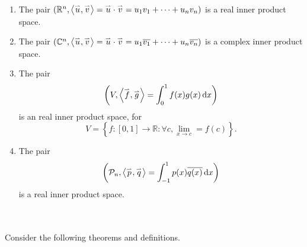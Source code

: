         \begin{enumerate}
            \item The pair \((\mathbb{R}^n, \left\langle \overset{_{\rightharpoonup}}{u},\overset{_{\rightharpoonup}}{v}\right\rangle=\overset{_{\rightharpoonup}}{u}\cdot\overset{_{\rightharpoonup}}{v}=u_1v_1+\cdots+u_nv_n)\) is a real inner product space.
            \item The pair \((\mathbb{C}^n, \left\langle \overset{_{\rightharpoonup}}{u},\overset{_{\rightharpoonup}}{v}\right\rangle=\overset{_{\rightharpoonup}}{u}\cdot\overset{_{\rightharpoonup}}{v}=u_1\overline{v_1}+\cdots+u_n\overline{v_n})\) is a complex inner product space.
            \item The pair 
                \begin{equation*}
                    \left(V,\left\langle \overset{_{\rightharpoonup}}{f},\overset{_{\rightharpoonup}}{g}\right\rangle=\int_0^1 f(x)g(x)\,\text{d} x\right)
                \end{equation*}
                is an real inner product space, for 
                \begin{equation*}
                    V=\left\{f:[0,1]\to\mathbb{R}:\forall c, \lim_{x\to c}=f(c)\right\}.
                \end{equation*}
            \item The pair
            \begin{equation*}
                \left(\mathcal{P}_n,\left\langle \overset{_{\rightharpoonup}}{p},\overset{_{\rightharpoonup}}{q}\right\rangle=\int_{-1}^1 p(x)\overline{q(x)}\,\text{d} x\right)
            \end{equation*}
            is a real inner product space.
        \end{enumerate}
        \pagebreak
        \vphantom
        \\
        \\
        Consider the following theorems and definitions.

